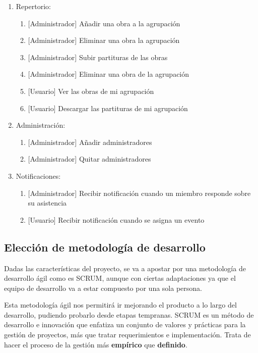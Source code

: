 \begin{enumerate}
\begin{enumerate}
    \end{enumerate}
    \item Repertorio:
    \begin{enumerate}
        \item {[Administrador]} Añadir una obra a la agrupación
        \item {[Administrador]} Eliminar una obra la agrupación
        \item {[Administrador]} Subir partituras de las obras
        \item {[Administrador]} Eliminar una obra de la agrupación
        \item {[Usuario]} Ver las obras de mi agrupación
        \item {[Usuario]} Descargar las partituras de mi agrupación
    \end{enumerate}
    \item Administración:
    \begin{enumerate}
        \item {[Administrador]} Añadir administradores
        \item {[Administrador]} Quitar administradores
    \end{enumerate}
    \item Notificaciones:
    \begin{enumerate}
        \item {[Administrador]} Recibir notificación cuando un miembro responde sobre su asistencia
        \item {[Usuario]} Recibir notificación cuando se asigna un evento
    \end{enumerate}
\end{enumerate}


\subsection{Elección de metodología de desarrollo}

Dadas las características del proyecto, se va a apostar por una metodología de desarrollo ágil como es SCRUM, aunque con ciertas adaptaciones ya que el equipo de desarrollo va a estar compuesto por una sola persona.

Esta metodología ágil nos permitirá ir mejorando el producto a lo largo del desarrollo, pudiendo probarlo desde etapas tempranas. SCRUM es un método de desarrollo e innovación que enfatiza un conjunto de valores y prácticas para la gestión de proyectos, más que tratar requerimientos e implementación. Trata de hacer el proceso de la gestión más \textbf{empírico} que \textbf{definido}.\cite{scrum}

